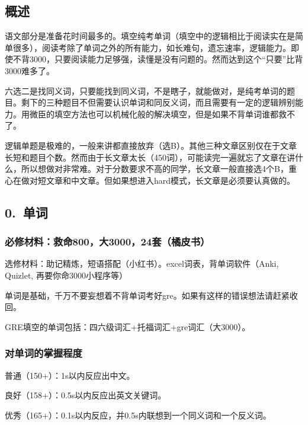 \documentclass[11pt,a4paper]{article}
\begin{document}
{{		\subsection*{概述}
			语文部分是准备花时间最多的。填空纯考单词（填空中的逻辑相比于阅读实在是简单很多），阅读考除了单词之外的所有能力，如长难句，遗忘速率，逻辑能力。即使不背3000，只要阅读能力足够强，读懂是没有问题的。然而达到这个“只要”比背3000难多了。
			\par 六选二是找同义词，只要能找到同义词，不是瞎子，就能做对，是纯考单词的题目。剩下的三种题目不但需要认识单词和同反义词，而且需要有一定的逻辑辨别能力。用微臣的填空方法也可以机械化般的解决填空，但是如果不背单词谁都救不了。
			\par 逻辑单题是极难的，一般来讲都直接放弃（选B）。其他三种文章区别仅在于文章长短和题目个数。然而由于长文章太长（450词），可能读完一遍就忘了文章在讲什么，所以想做对非常难。对于分数要求不高的同学，长文章一般直接选4个B，重心在做对短文章和中文章。但如果想进入hard模式，长文章是必须要认真做的。
			
			\vspace{22pt}{\bfseries
				总体来说，对中国考生，填空还是比阅读要简单的。在考试中填空的正确率一般也比阅读高。
			}
		\subsection*{0.~单词}{
			\subsubsection*{必修材料：救命800，大3000，24套（橘皮书）}
				选修材料：助记精炼，短语搭配（小红书）。excel词表，背单词软件（Anki, Quizlet, 再要你命3000小程序等）
				
				单词是基础，千万不要妄想着不背单词考好gre。如果有这样的错误想法请赶紧收回。
			
				GRE填空的单词包括：四六级词汇+托福词汇+gre词汇（大3000）。
				
			\subsubsection*{对单词的掌握程度}
				普通（150+）：1s以内反应出中文。
				\par 良好（158+）：0.5s以内反应出英文关键词。
				\par 优秀（165+）：0.1s以内反应，并0.5s内联想到一个同义词和一个反义词。
				
}}}
\end{document}
